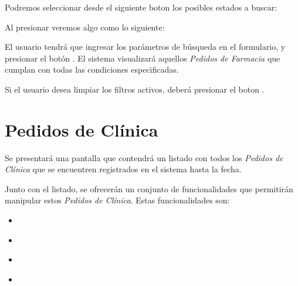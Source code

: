 \documentclass[a4paper,10pt,spanish]{sphinxmanual}
\begin{document}
Podremos seleccionar desde el siguiente boton los posibles estados a buscar:


Al presionar veremos algo como lo siguiente:


El usuario tendrá que ingresar los parámetros de búsqueda en el formulario, y presionar el botón . El sistema visualizará aquellos \emph{Pedidos de Farmacia} que cumplan con todas las condiciones especificadas.

Si el usuario desea limpiar los filtros activos, deberá presionar el boton .



\section{Pedidos de Clínica}
\label{pedidosclinica:pedidos-de-clinica}\label{pedidosclinica::doc}
Se presentará una pantalla que contendrá un listado con todos los \emph{Pedidos de Clínica} que se encuentren registrados en el sistema hasta la fecha.


Junto con el listado, se ofrecerán un conjunto de funcionalidades que permitirán manipular estos \emph{Pedidos de Clínica}.
Estas funcionalidades son:
\begin{itemize}
\item {} 
{\hyperref[pedidosclinica:alta\string-pc]{}}

\item {} 
{\hyperref[pedidosclinica:ver\string-detalles\string-pc]{}}

\item {} 
{\hyperref[pedidosclinica:ver\string-remitos\string-pc]{}}

\item {} 
{\hyperref[pedidosclinica:formulario\string-busqueda\string-pc]{}}

\end{itemize}
\end{document}

